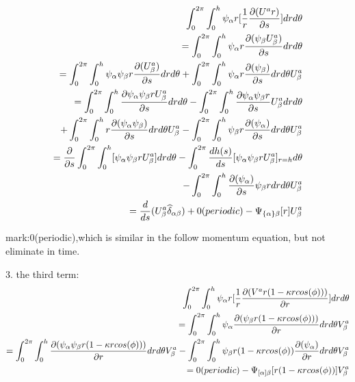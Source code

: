 \documentclass{Note}
\begin{document}
\begin{equation}
\begin{aligned}
\int_0^{2\pi}\int_0^h \psi_\alpha r [{1\over r} {\partial(U^a r)\over \partial s}] dr d\theta\\
=\int_0^{2\pi}\int_0^h \psi_\alpha r{\partial( \psi_\beta U_\beta^a)\over \partial s} dr d\theta \\
=\int_0^{2\pi}\int_0^h \psi_\alpha \psi_\beta r{\partial( U_\beta^a )\over \partial s} dr d\theta +\int_0^{2\pi}\int_0^h \psi_\alpha r{\partial( \psi_\beta )\over \partial s} dr d\theta U_\beta^a\\
=\int_0^{2\pi}\int_0^h {\partial \psi_\alpha \psi_\beta r U_\beta^a \over \partial s} dr d\theta
-\int_0^{2\pi}\int_0^h {\partial \psi_\alpha \psi_\beta r  \over \partial s}U_\beta^a dr d\theta\\
+\int_0^{2\pi}\int_0^h  r{\partial( \psi_\alpha \psi_\beta )\over \partial s} dr d\theta U_\beta^a
-\int_0^{2\pi}\int_0^h \psi_\beta   r{\partial( \psi_\alpha )\over \partial s} dr d\theta U_\beta^a\\
={{\partial }\over {\partial s}}\int_0^{2\pi}\int_0^h   [ \psi_\alpha \psi_\beta r U_\beta^a] dr d\theta 
-\int_0^{2\pi}{dh(s)\over ds}[ \psi_\alpha \psi_\beta r U_\beta^a]_{r=h}d\theta\\
-\int_0^{2\pi}\int_0^h   {\partial( \psi_\alpha )\over \partial s}\psi_\beta r dr d\theta U_\beta^a\\
={d \over d s}(U_\beta^a \widehat{\delta }_{\alpha\beta})+0(periodic)-\Psi_{\{\alpha\}\beta}[r]U_\beta^a
\end{aligned}
\end{equation}

mark:0(periodic),which is similar in the follow momentum equation, but not eliminate in time.

3. the third term:
\begin{equation}
\begin{aligned}
\int_0^{2\pi}\int_0^h \psi_\alpha r [{1\over r}{\partial(V^a r(1-\kappa r cos(\phi)))\over \partial r}] dr d\theta\\
=\int_0^{2\pi}\int_0^h \psi_\alpha {\partial(\psi_\beta r(1-\kappa r cos(\phi)))\over \partial r} dr d\theta V_\beta^a\\
=\int_0^{2\pi}\int_0^h {\partial(\psi_\alpha  \psi_\beta r(1-\kappa r cos(\phi)))\over \partial r}dr d\theta V_\beta^a-\int_0^{2\pi}\int_0^h\psi_\beta  r(1-\kappa r cos(\phi)){\partial(\psi_\alpha  )\over \partial r} dr d\theta V_\beta^a\\
=0(periodic)-\Psi_{[\alpha]\beta}[ r(1-\kappa r cos(\phi))]V_\beta^a
\end{aligned}
\end{equation}
\end{document}
